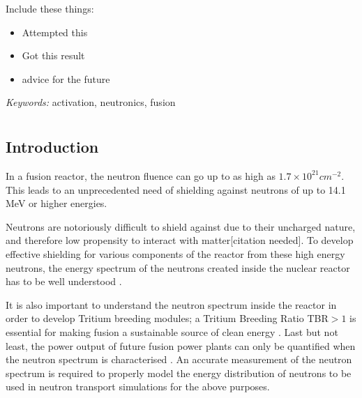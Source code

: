 \documentclass[a4paper, 12pt]{article}
\begin{document}
\abstract
Include these things:
\begin{itemize}
    \item Attempted this
    \item Got this result
    \item advice for the future
\end{itemize}
\emph{Keywords:} activation, neutronics, fusion
\pagebreak
\tableofcontents
\listoffigures
\pagebreak


\chapter{}
\section{Introduction}
    

In a fusion reactor, the neutron fluence can go up to as high as $1.7 \times 10^{21} cm^{-2}$\cite{14MeVNNeutonYieldCalibration-JET}.
This leads to an unprecedented need of shielding against neutrons of up to 14.1 MeV or higher energies.

Neutrons are notoriously difficult to shield against due to their uncharged nature, and therefore low propensity to interact with matter[citation needed]. To develop effective shielding for various components of the reactor from these high energy neutrons, the energy spectrum of the neutrons created inside the nuclear reactor has to be well understood \cite{TechnologicalExploitationOfDT}.

It is also important to understand the neutron spectrum inside the reactor in order to develop Tritium breeding modules; a Tritium Breeding Ratio TBR$>1$ is essential for making fusion a sustainable source of clean energy \cite{TBMD_Design}.
Last but not least, the power output of future fusion power plants can only be quantified when the neutron spectrum is characterised \cite{FusionYieldMeasurementOnJETAndTheirCalibration}.
An accurate measurement of the neutron spectrum is required to properly model the energy distribution of neutrons to be used in neutron transport simulations for the above purposes.
\end{document}
